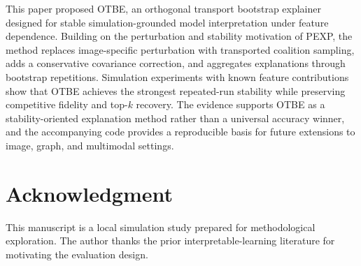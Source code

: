 \documentclass[10pt,conference,letterpaper]{IEEEtran}
\newcommand{\method}{OTBE}
\begin{document}
This paper proposed \method{}, an orthogonal transport bootstrap explainer designed for stable simulation-grounded model interpretation under feature dependence.  Building on the perturbation and stability motivation of PEXP, the method replaces image-specific perturbation with transported coalition sampling, adds a conservative covariance correction, and aggregates explanations through bootstrap repetitions.  Simulation experiments with known feature contributions show that \method{} achieves the strongest repeated-run stability while preserving competitive fidelity and top-$k$ recovery.  The evidence supports \method{} as a stability-oriented explanation method rather than a universal accuracy winner, and the accompanying code provides a reproducible basis for future extensions to image, graph, and multimodal settings.

\section*{Acknowledgment}
This manuscript is a local simulation study prepared for methodological exploration.  The author thanks the prior interpretable-learning literature for motivating the evaluation design.



\end{document}
